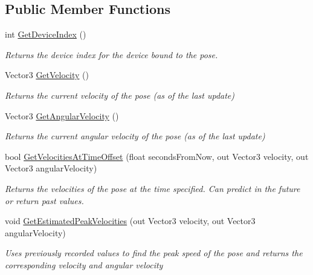 \subsection*{Public Member Functions}
\begin{DoxyCompactItemize}
\item 
int \mbox{\hyperlink{class_valve_1_1_v_r_1_1_steam_v_r___behaviour___pose_a045c834f9f876b6eb28c916fe0a4c503}{Get\+Device\+Index}} ()
\begin{DoxyCompactList}\small\item\em Returns the device index for the device bound to the pose. \end{DoxyCompactList}\item 
Vector3 \mbox{\hyperlink{class_valve_1_1_v_r_1_1_steam_v_r___behaviour___pose_ac36bf2a333805b149722844bf2994256}{Get\+Velocity}} ()
\begin{DoxyCompactList}\small\item\em Returns the current velocity of the pose (as of the last update) \end{DoxyCompactList}\item 
Vector3 \mbox{\hyperlink{class_valve_1_1_v_r_1_1_steam_v_r___behaviour___pose_aa89766e6a3e7d4704441f6ccdc0930f3}{Get\+Angular\+Velocity}} ()
\begin{DoxyCompactList}\small\item\em Returns the current angular velocity of the pose (as of the last update) \end{DoxyCompactList}\item 
bool \mbox{\hyperlink{class_valve_1_1_v_r_1_1_steam_v_r___behaviour___pose_a5074775b7384f0eb3754b52b4c46df17}{Get\+Velocities\+At\+Time\+Offset}} (float seconds\+From\+Now, out Vector3 velocity, out Vector3 angular\+Velocity)
\begin{DoxyCompactList}\small\item\em Returns the velocities of the pose at the time specified. Can predict in the future or return past values. \end{DoxyCompactList}\item 
void \mbox{\hyperlink{class_valve_1_1_v_r_1_1_steam_v_r___behaviour___pose_aff9156a545cb6722a73421ac20ebeba9}{Get\+Estimated\+Peak\+Velocities}} (out Vector3 velocity, out Vector3 angular\+Velocity)
\begin{DoxyCompactList}\small\item\em Uses previously recorded values to find the peak speed of the pose and returns the corresponding velocity and angular velocity \end{DoxyCompactList}\item 

\end{DoxyCompactItemize}
